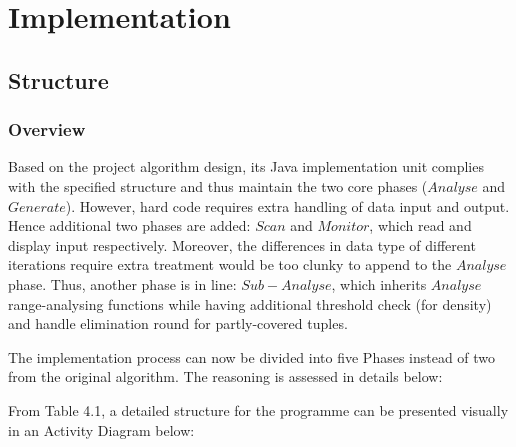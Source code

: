 \chapter{Implementation}

\section{Structure}

\subsection{Overview}

Based on the project algorithm design, its Java implementation unit complies with the specified structure and thus maintain the two core phases ($Analyse$ and $Generate$). However, hard code requires extra handling of data input and output. Hence additional two phases are added: $Scan$ and $Monitor$, which read and display input respectively. Moreover, the differences in data type of different iterations require extra treatment would be too clunky to append to the $Analyse$ phase. Thus, another phase is in line: $Sub-Analyse$, which inherits $Analyse$ range-analysing functions while having additional threshold check (for density) and handle elimination round for partly-covered tuples.  

The implementation process can now be divided into five Phases instead of two from the original algorithm. The reasoning is assessed in details below:



From Table 4.1, a detailed structure for the programme can be presented visually in an Activity Diagram below:

